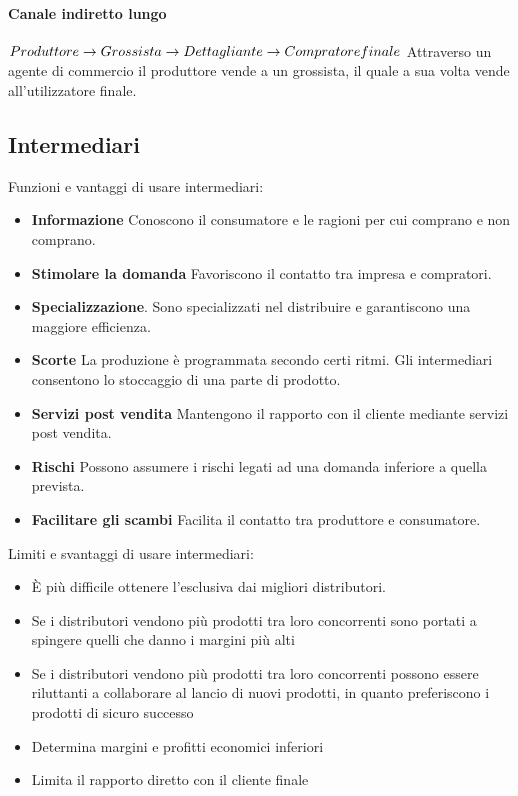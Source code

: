 \paragraph{Canale indiretto lungo}
$ \\ Produttore \rightarrow Grossista\rightarrow Dettagliante \rightarrow Compratore finale  \\$
Attraverso un agente di commercio il produttore vende a un grossista, il quale a sua volta vende all’utilizzatore finale.

\subsection{Intermediari}
Funzioni e vantaggi di usare intermediari:
\begin{itemize}
	\item \textbf{Informazione} Conoscono il consumatore e le ragioni per cui comprano e non comprano.
	\item \textbf{Stimolare la domanda} Favoriscono il contatto tra impresa e compratori.
	\item \textbf{Specializzazione}. Sono specializzati nel distribuire e garantiscono una maggiore efficienza.
	\item \textbf{Scorte} La produzione è programmata secondo certi ritmi. Gli intermediari consentono lo stoccaggio di una parte di prodotto.
	\item \textbf{Servizi post vendita} Mantengono il rapporto con il cliente mediante servizi post vendita.
	\item \textbf{Rischi} Possono assumere i rischi legati ad una domanda inferiore a quella prevista.
	\item \textbf{Facilitare gli scambi} Facilita il contatto tra produttore e
	consumatore.
\end{itemize}
Limiti e svantaggi di usare intermediari:
\begin{itemize}
	\item È più difficile ottenere l’esclusiva dai migliori distributori.
	\item Se i distributori vendono più prodotti tra loro concorrenti sono portati a spingere quelli che danno i margini più alti
	\item Se i distributori vendono più prodotti tra loro concorrenti possono essere riluttanti a collaborare al lancio di nuovi prodotti, in quanto preferiscono i prodotti di sicuro successo
	\item Determina margini e profitti economici inferiori
	\item Limita il rapporto diretto con il cliente finale
\end{itemize}

